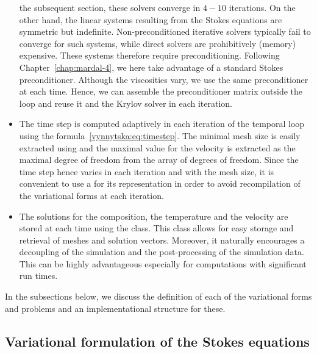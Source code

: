 \begin{itemize}
  the subsequent section, these solvers converge in $4 - 10$
  iterations.  On the other hand, the linear systems resulting from
  the Stokes equations are symmetric but
  indefinite. Non-preconditioned iterative solvers typically fail to
  converge for such systems, while direct solvers are prohibitively
  (memory) expensive. These systems therefore require
  preconditioning. Following Chapter~\ref{chap:mardal-4}, we here take
  advantage of a standard Stokes preconditioner. Although the
  viscosities vary, we use the same preconditioner at each
  time. Hence, we can assemble the preconditioner matrix outside the
  loop and reuse it and the Krylov solver in each iteration.
\item
  The time step  is computed adaptively in each iteration of
  the temporal loop using the
  formula~\eqref{vynnytska:eq:timestep}. The minimal mesh size is
  easily extracted using  and the maximal value for
  the velocity is extracted as the maximal degree of freedom from the
   array of degrees of freedom. Since the time step hence
  varies in each iteration and with the mesh size, it is convenient to
  use a  for its representation in order to avoid
  recompilation of the variational forms at each iteration.
\item
  The solutions for the composition, the temperature and the velocity
  are stored at each time using the  class. This
  class allows for easy storage and retrieval of meshes and solution
  vectors. Moreover, it naturally encourages a decoupling of the
  simulation and the post-processing of the simulation data. This can
  be highly advantageous especially for computations with significant
  run times.
\end{itemize}
In the subsections below, we discuss the definition of each of the
variational forms and problems and an implementational structure for
these.

\subsection{Variational formulation of the Stokes equations}


